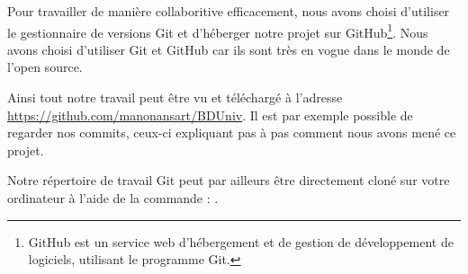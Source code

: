 Pour travailler de manière collaboritive efficacement, nous avons choisi d'utiliser le gestionnaire de versions Git et d'héberger notre projet sur GitHub\footnote{GitHub est un service web d'hébergement et de gestion de développement de logiciels, utilisant le programme Git.}. Nous avons choisi d'utiliser Git et GitHub car ils sont très en vogue dans le monde de l'open source.

Ainsi tout notre travail peut être vu et téléchargé à l'adresse \url{https://github.com/manonansart/BDUniv}. Il est par exemple possible de regarder nos commits, ceux-ci expliquant pas à pas comment nous avons mené ce projet.

Notre répertoire de travail Git peut par ailleurs être directement cloné sur votre ordinateur à l'aide de la commande : .